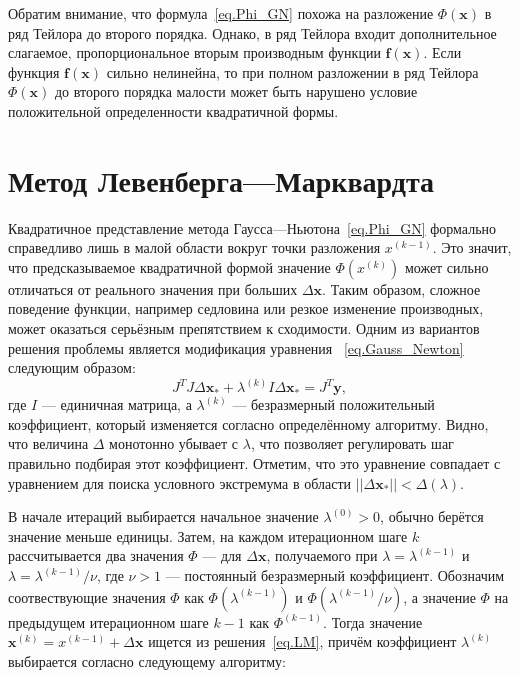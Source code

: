\documentclass[fontsize=12pt, paper=a4]{article}
\renewcommand{\vec}[1]{\mathbf{#1}}
\def\x{\vec{x}}
\def\y{\vec{y}}
\def\f{\vec{f}}
\def\m{\x_*}
\begin{document}
Обратим внимание, что формула~\eqref{eq.Phi_GN} похожа на разложение $\Phi(\x)$ в ряд Тейлора до второго порядка.
Однако, в ряд Тейлора входит дополнительное слагаемое, пропорциональное вторым производным функции $\f(\x)$.
Если функция $\f(\x)$ сильно нелинейна, то при полном разложении в ряд Тейлора $\Phi(\x)$ до второго порядка малости может быть нарушено условие положительной определенности квадратичной формы.


\section{Метод Левенберга---Марквардта}
Квадратичное представление метода Гаусса---Ньютона~\eqref{eq.Phi_GN} формально справедливо лишь в малой области вокруг точки разложения $x^{(k-1)}$.
Это значит, что предсказываемое квадратичной формой значение $\Phi(x^{(k)})$ может сильно отличаться от реального значения при больших $\Delta\x$.
Таким образом, сложное поведение функции, например седловина или резкое изменение производных, может оказаться серьёзным препятствием к сходимости.
Одним из вариантов решения проблемы является модификация уравнения ~\eqref{eq.Gauss_Newton} следующим образом:
\begin{equation}
J^TJ \Delta\m + \lambda^{(k)} I \Delta\m = J^T \y, \label{eq.LM}
\end{equation}
где $I$ --- единичная матрица, а $\lambda^{(k)}$ --- безразмерный положительный коэффициент, который изменяется согласно определённому алгоритму.
Видно, что величина $\Delta$ монотонно убывает с $\lambda$, что позволяет регулировать шаг правильно подбирая этот коэффициент.
Отметим, что это уравнение совпадает с уравнением для поиска условного экстремума в области $||\Delta\m|| < \Delta(\lambda)$.

В начале итераций выбирается начальное значение $\lambda^{(0)} > 0$, обычно берётся значение меньше единицы.
Затем, на каждом итерационном шаге $k$ рассчитывается два значения $\Phi$ — для $\Delta\x$, получаемого при $\lambda = \lambda^{(k-1)}$ и $\lambda = \lambda^{(k-1)} / \nu$, где $\nu > 1$ --- постоянный безразмерный коэффициент.
Обозначим соотвествующие значения $\Phi$ как $\Phi( \lambda^{(k-1)})$ и $\Phi(\lambda^{(k-1)} / \nu)$, а значение $\Phi$ на предыдущем итерационном шаге $k-1$ как $\Phi^{(k-1)}$.
Тогда значение $\x^{(k)} = x^{(k-1)} + \Delta\x$ ищется из решения~\eqref{eq.LM}, причём коэффициент $\lambda^{(k)}$ выбирается согласно следующему алгоритму:
\end{document}
